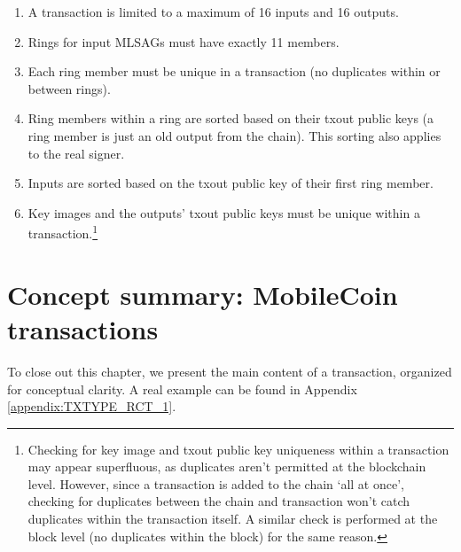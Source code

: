 \begin{enumerate}
    \item A transaction is limited to a maximum of 16 inputs and 16 outputs.
    \item Rings for input MLSAGs must have exactly 11 members.
    \item Each ring member must be unique in a transaction (no duplicates within or between rings).
    \item Ring members within a ring are sorted based on their txout public keys (a ring member is just an old output from the chain). This sorting also applies to the real signer.
    \item Inputs are sorted based on the txout public key of their first ring member.
    \item Key images and the outputs' txout public keys must be unique within a transaction.\footnote{Checking for key image and txout public key uniqueness within a transaction may appear superfluous, as duplicates aren't permitted at the blockchain level. However, since a transaction is added to the chain `all at once', checking for duplicates between the chain and transaction won't catch duplicates within the transaction itself. A similar check is performed at the block level (no duplicates within the block) for the same reason.}
\end{enumerate}



\newpage
\section{Concept summary: MobileCoin transactions}
\label{sec:transaction_summary}

To close out this chapter, we present the main content of a transaction, organized for conceptual clarity. A real example can be found in Appendix \ref{appendix:TXTYPE_RCT_1}.

